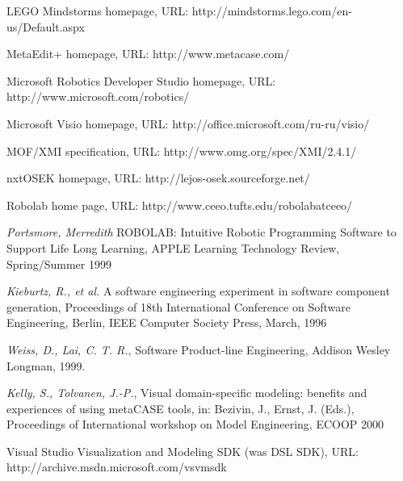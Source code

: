 \documentclass[a4paper]{article}
\begin{document}
\begin{thebibliography}{9001}
   LEGO Mindstorms homepage, URL: http://mindstorms.lego.com/en-us/Default.aspx

   MetaEdit+ homepage, URL: http://www.metacase.com/ 

   Microsoft Robotics Developer Studio homepage, URL: http://www.microsoft.com/robotics/ 

   Microsoft Visio homepage, URL: http://office.microsoft.com/ru-ru/visio/

   MOF/XMI specification, URL: http://www.omg.org/spec/XMI/2.4.1/ 

   nxtOSEK homepage, URL: http://lejos-osek.sourceforge.net/ 

   Robolab home page, URL: http://www.ceeo.tufts.edu/robolabatceeo/ 

   \emph{Portsmore, Merredith} ROBOLAB: Intuitive Robotic Programming Software to Support Life Long Learning, APPLE Learning Technology Review, Spring/Summer 1999

   \emph{Kieburtz, R., et al.} A software engineering experiment in software component generation, Proceedings of 18th International Conference on Software Engineering, Berlin, IEEE Computer Society Press, March, 1996

   \emph{Weiss, D., Lai, C. T. R.}, Software Product-line Engineering, Addison Wesley Longman, 1999.

   \emph{Kelly, S., Tolvanen, J.-P.}, Visual domain-specific modeling: benefits and experiences of using metaCASE tools, in: Bezivin, J., Ernst, J. (Eds.), Proceedings of International workshop on Model Engineering, ECOOP 2000

   Visual Studio Visualization and Modeling SDK (was DSL SDK), URL: http://archive.msdn.microsoft.com/vsvmsdk 

\end{thebibliography}
\end{document}
